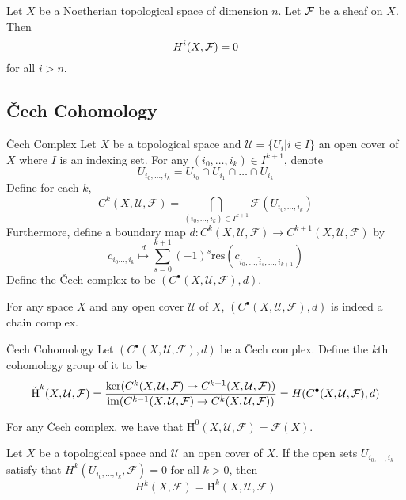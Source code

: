 \documentclass[a4paper]{article}
\begin{document}
\begin{thm}{}{} Let $X$ be a Noetherian topological space of dimension $n$. Let $\mathcal{F}$ be a sheaf on $X$. Then $$H^i(X,\mathcal{F})=0$$ for all $i>n$. 
\end{thm}

\subsection{\v{C}ech Cohomology}
\begin{defn}{\v{C}ech Complex}{} Let $X$ be a topological space and $\mathcal{U}=\{U_i|i\in I\}$ an open cover of $X$ where $I$ is an indexing set. For any $(i_0,\dots,i_k)\in I^{k+1}$, denote $$U_{i_0,\dots,i_k}=U_{i_0}\cap U_{i_1}\cap\dots\cap U_{i_k}$$ Define for each $k$, $$C^k(X,\mathcal{U},\mathcal{F})=\bigcap_{(i_0,\dots,i_k)\in I^{k+1}}\mathcal{F}(U_{i_0,\dots,i_k})$$ Furthermore, define a boundary map $d:C^k(X,\mathcal{U},\mathcal{F})\to C^{k+1}(X,\mathcal{U},\mathcal{F})$ by $$c_{i_0\dots,i_k}\overset{d}{\mapsto}\sum_{s=0}^{k+1}(-1)^s\text{res}(c_{i_0,\dots,\hat{i}_s,\dots,i_{k+1}})$$ Define the \v{C}ech complex to be $(C^\bullet(X,\mathcal{U},\mathcal{F}),d)$. 
\end{defn}

\begin{lmm}{}{} For any space $X$ and any open cover $\mathcal{U}$ of $X$, $(C^\bullet(X,\mathcal{U},\mathcal{F}),d)$ is indeed a chain complex. 
\end{lmm}

\begin{defn}{\v{C}ech Cohomology}{} Let $(C^\bullet(X,\mathcal{U},\mathcal{F}),d)$ be a \v{C}ech complex. Define the $k$th cohomology group of it to be $$\text{\v{H}}^k(X,\mathcal{U},\mathcal{F})=\frac{\ker(C^k(X,\mathcal{U},\mathcal{F})\to C^{k+1}(X,\mathcal{U},\mathcal{F}))}{\im(C^{k-1}(X,\mathcal{U},\mathcal{F})\to C^k(X,\mathcal{U},\mathcal{F}))}=H(C^\bullet(X,\mathcal{U},\mathcal{F}),d)$$
\end{defn}

\begin{lmm}{}{} For any \v{C}ech complex, we have that $\text{\v{H}}^0(X,\mathcal{U},\mathcal{F})=\mathcal{F}(X)$. 
\end{lmm}

\begin{thm}{}{} Let $X$ be a topological space and $\mathcal{U}$ an open cover of $X$. If the open sets $U_{i_0,\dots,i_k}$ satisfy that $H^k(U_{i_0,\dots,i_k},\mathcal{F})=0$ for all $k>0$, then $$H^k(X,\mathcal{F})=\text{\v{H}}^k(X,\mathcal{U},\mathcal{F})$$
\end{thm}
\end{document}
